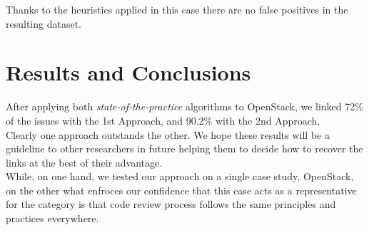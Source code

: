 \documentclass[conference,compsoc]{IEEEtran}
\begin{document}
Thanks to the heuristics applied in this case there are no false positives in the 
resulting dataset. 

\section{Results and Conclusions}

After applying both \emph{state-of-the-practice} algorithms to OpenStack, we linked 
72\% of the issues with the 1st Approach, and 90.2\% with the 2nd Approach.
\\
Clearly one approach outstands the other. We
hope these results will be a guideline to other researchers in
future helping them to decide how to recover the links at the
best of their advantage. 
\\
While, on one hand, we tested our
approach on a single case study, OpenStack, on the other
what enfroces our confidence that this case acts as a representative 
for the category is that code review process follows
the same principles and practices everywhere.





%
%
\end{document}
